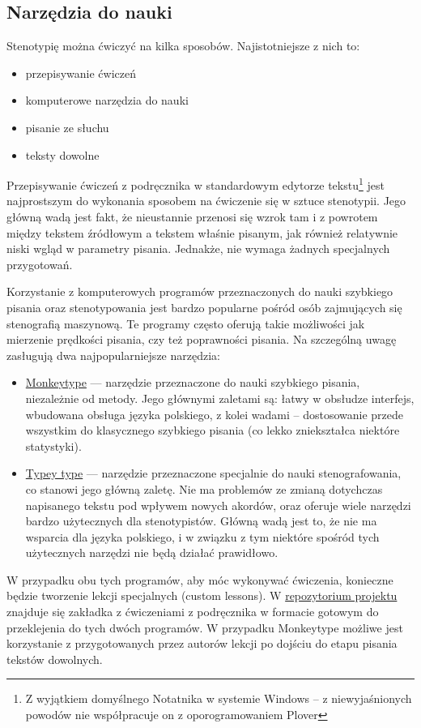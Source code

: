 \documentclass[12p, oneside]{book}
\begin{document}
\subsection*{Narzędzia do nauki}

Stenotypię można ćwiczyć na kilka sposobów. Najistotniejsze z nich to:
\begin{itemize}
	\item przepisywanie ćwiczeń
	\item komputerowe narzędzia do nauki
	\item pisanie ze słuchu
	\item teksty dowolne
\end{itemize}

Przepisywanie ćwiczeń z podręcznika w standardowym edytorze tekstu\footnote{Z wyjątkiem domyślnego Notatnika w systemie Windows -- z niewyjaśnionych powodów nie współpracuje on z oporogramowaniem Plover} jest najprostszym do wykonania sposobem na ćwiczenie się w sztuce stenotypii. Jego główną wadą jest fakt, że nieustannie przenosi się wzrok tam i z powrotem między tekstem źródłowym a tekstem właśnie pisanym, jak również relatywnie niski wgląd w parametry pisania. Jednakże, nie wymaga żadnych specjalnych przygotowań.

Korzystanie z komputerowych programów przeznaczonych do nauki szybkiego pisania oraz stenotypowania jest bardzo popularne pośród osób zajmujących się stenografią maszynową. Te programy często oferują takie możliwości jak mierzenie prędkości pisania, czy też poprawności pisania. Na szczególną uwagę zasługują dwa najpopularniejsze narzędzia:
\begin{itemize}
	\item \href{https://monkeytype.com/}{Monkeytype} --- narzędzie przeznaczone do nauki szybkiego pisania, niezależnie od metody. Jego głównymi zaletami są: łatwy w obsłudze interfejs, wbudowana obsługa języka polskiego, z kolei wadami -- dostosowanie przede wszystkim do klasycznego szybkiego pisania (co lekko zniekształca niektóre statystyki).
	\item \href{https://didoesdigital.com/typey-type/}{Typey type} --- narzędzie przeznaczone specjalnie do nauki stenografowania, co stanowi jego główną zaletę. Nie ma problemów ze zmianą dotychczas napisanego tekstu pod wpływem nowych akordów, oraz oferuje wiele narzędzi bardzo użytecznych dla stenotypistów. Główną wadą jest to, że nie ma wsparcia dla języka polskiego, i w związku z tym niektóre spośród tych użytecznych narzędzi nie będą działać prawidłowo.
\end{itemize}
W przypadku obu tych programów, aby móc wykonywać ćwiczenia, konieczne będzie tworzenie lekcji specjalnych (custom lessons). W \href{https://github.com/bspat/Stenotypia-polska/tree/main/podrecznik/cwiczenia}{repozytorium projektu} znajduje się zakładka z ćwiczeniami z podręcznika w formacie gotowym do przeklejenia do tych dwóch programów. W przypadku Monkeytype możliwe jest korzystanie z przygotowanych przez autorów lekcji po dojściu do etapu pisania tekstów dowolnych.
\end{document}
